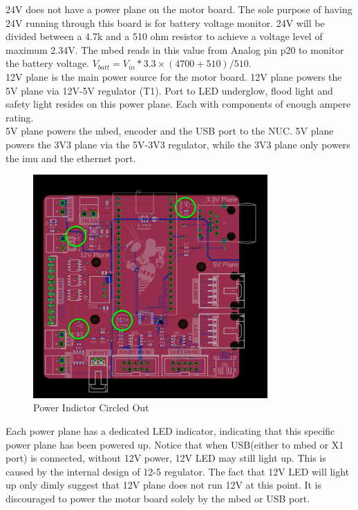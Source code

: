 \documentclass[letterpaper, 12pt]{article}
\begin{document}
24V does not have a power plane on the motor board. The sole purpose of having 24V running through this board is for battery voltage monitor. 24V will be divided between a 4.7k and a 510 ohm resistor to achieve a voltage level of maximum 2.34V. The mbed reads in this value from Analog pin p20 to monitor the battery voltage. $V_{batt} = V_{in} * 3.3 \times (4700 + 510) / 510$. \\

12V plane is the main power source for the motor board. 12V plane powers the 5V plane via 12V-5V regulator (T1). Port to LED underglow, flood light and safety light resides on this power plane. Each with components of enough ampere rating. \\

5V plane powers the mbed, encoder and the USB port to the NUC. 5V plane powers the 3V3 plane via the 5V-3V3 regulator, while the 3V3 plane only powers the imu and the ethernet port. \\

\begin{figure}[h]
\centering
\includegraphics[width=0.8\textwidth]{LED_Indicator.png}
\caption{Power Indictor Circled Out}
\end{figure}

Each power plane has a dedicated LED indicator, indicating that this specific power plane has been powered up. Notice that when USB(either to mbed or X1 port) is connected, without 12V power, 12V LED may still light up. This is caused by the internal design of 12-5 regulator. The fact that 12V LED will light up only dimly suggest that 12V plane does not run 12V at this point. It is discouraged to power the motor board solely by the mbed or USB port.
\end{document}
